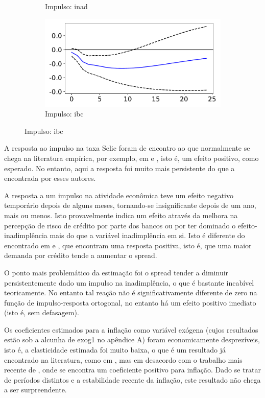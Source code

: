 \documentclass[a4paper,
               article,
               12pt,
               openany,
               oneside,
               english,
               brazil]{abntex2}
\numberwithin{equation}{section}
\begin{document}
\begin{figure}[!hbt]
\begin{subfigure}[t]{.5\linewidth}
            \caption{Impulso: inad}
        \end{subfigure}
        \begin{subfigure}[t]{.5\linewidth}
            \includegraphics[width = \textwidth, scale=1]{irf/orth_spread_ibc.pdf}
            \caption{Impulso: ibc}
        \end{subfigure}
    \end{figure}

    A resposta ao impulso na taxa Selic foram de encontro ao que normalmente se chega na literatura empírica, por exemplo, em \textcite{oreiro} e \textcite{chaim}, isto é, um efeito positivo, como esperado. No entanto, aqui a resposta foi muito mais persistente do que a encontrada por esses autores.

    A resposta a um impulso na atividade econômica teve um efeito negativo temporário depois de alguns meses, tornando-se insignificante depois de um ano, mais ou menos. Isto provavelmente indica um efeito através da melhora na percepção de risco de crédito por parte dos bancos ou por ter dominado o efeito-inadimplência mais do que a variável inadimplência em si. Isto é diferente do encontrado em \textcite{oreiro} e \textcite{chaim}, que encontram uma resposta positiva, isto é, que uma maior demanda por crédito tende a aumentar o spread.

    O ponto mais problemático da estimação foi o spread tender a diminuir persistentemente dado um impulso na inadimplência, o que é bastante incabível teoricamente. No entanto tal reação não é significativamente diferente de zero na função de impulso-resposta ortogonal, no entanto há um efeito positivo imediato (isto é, sem defasagem).

    Os coeficientes estimados para a inflação como variável exógena (cujos resultados estão sob a alcunha de exog1 no apêndice A) foram economicamente desprezíveis, isto é, a elasticidade estimada foi muito baixa, o que é um resultado já encontrado na literatura, como em \textcite{oreiro}, mas em desacordo com o trabalho mais recente de \textcite{chaim}, onde se encontra um coeficiente positivo para inflação. Dado se tratar de períodos distintos e a  estabilidade recente da inflação, este resultado não chega a ser surpreendente.
\end{document}
